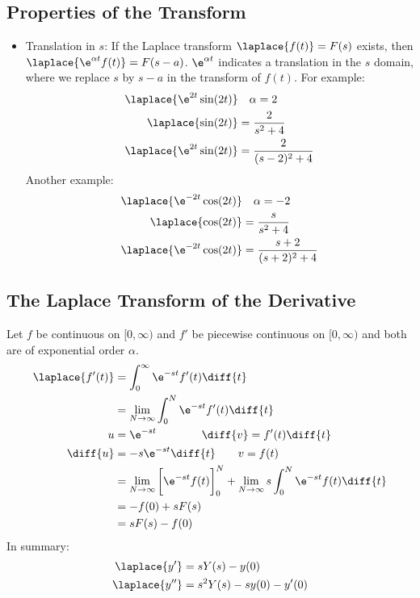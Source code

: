 \documentclass{math}
\begin{document}
\subsection*{Properties of the Transform}
\begin{itemize}
  \item Translation in \( s \): If the Laplace transform \( \laplace{f(t)} =
  F(s) \) exists, then \( \laplace{\e^{\alpha t}f(t)} = F(s-a) \).
  \( \e^{\alpha t} \) indicates a translation in the \( s \) domain, where we
  replace \( s \) by \( s-a \) in the transform of \( f(t) \). For example:
  \begin{align*}
    \laplace{\e^{2t}\sin(2t)} & \quad \alpha = 2 \\
    \laplace{\sin(2t)} &= \frac{2}{s^2+4} \\
    \laplace{\e^{2t}\sin(2t)} &= \frac{2}{(s-2)^2+4}
  \end{align*}
  Another example:
  \begin{align*}
    \laplace{\e^{-2t}\cos(2t)} & \quad \alpha = -2 \\
    \laplace{\cos(2t)} &= \frac{s}{s^2+4} \\
    \laplace{\e^{-2t}\cos(2t)} &= \frac{s+2}{(s+2)^2+4}
  \end{align*}
\end{itemize}

\subsection*{The Laplace Transform of the Derivative}
Let \( f \) be continuous on \( [0,\infty) \) and \( f' \) be piecewise
continuous on \( [0,\infty) \) and both are of exponential order \( \alpha \).
\begin{align*}
  \laplace{f'(t)} &= \int_{0}^{\infty}\e^{-st}f'(t)\diff{t} \\
  &= \lim_{N\to\infty}\int_{0}^{N}\e^{-st}f'(t)\diff{t} \\
  u &= \e^{-st} \quad\quad\quad\quad \diff{v} = f'(t)\diff{t} \\
  \diff{u} &= -s\e^{-st}\diff{t} \quad\quad v = f(t) \\
  &= \lim_{N\to\infty}\bigg[\e^{-st}f(t)\bigg]_{0}^{N}+
    \lim_{N\to\infty}s\int_{0}^{N}\e^{-st}f(t)\diff{t} \\
  &= -f(0)+sF(s) \\
  &= sF(s)-f(0)
\end{align*}
In summary:
\begin{align*}
  \laplace{y'} &= sY(s)-y(0) \\
  \laplace{y''} &= s^2Y(s)-sy(0)-y'(0)
\end{align*}
\end{document}
